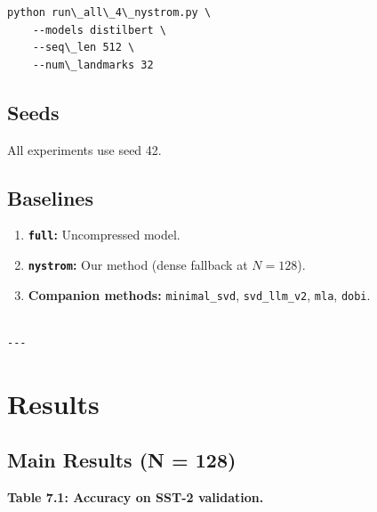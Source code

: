 \begin{lstlisting}
python run\_all\_4\_nystrom.py \
    --models distilbert \
    --seq\_len 512 \
    --num\_landmarks 32
\end{lstlisting}

\subsection{Seeds}

All experiments use seed 42.

\subsection{Baselines}

\begin{enumerate}
\item \textbf{\texttt{full}:} Uncompressed model.
\item \textbf{\texttt{nystrom}:} Our method (dense fallback at $N=128$).
\item \textbf{Companion methods:} \texttt{minimal\_svd}, \texttt{svd\_llm\_v2}, \texttt{mla}, \texttt{dobi}.
\end{enumerate}
\begin{lstlisting}

---
\end{lstlisting}


\section{Results}

\subsection{Main Results (N = 128)}

\textbf{Table 7.1: Accuracy on SST-2 validation.}

